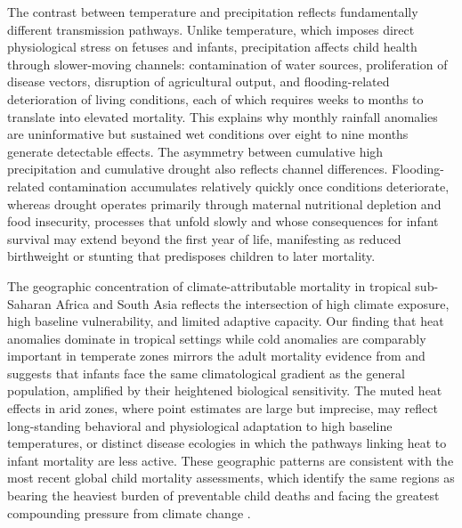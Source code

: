 \documentclass[a4paper]{article}
\begin{document}
The contrast between temperature and precipitation reflects fundamentally different transmission pathways. Unlike temperature, which imposes direct physiological stress on fetuses and infants, precipitation affects child health through slower-moving channels: contamination of water sources, proliferation of disease vectors, disruption of agricultural output, and flooding-related deterioration of living conditions, each of which requires weeks to months to translate into elevated mortality. This explains why monthly rainfall anomalies are uninformative but sustained wet conditions over eight to nine months generate detectable effects. The asymmetry between cumulative high precipitation and cumulative drought also reflects channel differences. Flooding-related contamination accumulates relatively quickly once conditions deteriorate, whereas drought operates primarily through maternal nutritional depletion and food insecurity, processes that unfold slowly and whose consequences for infant survival may extend beyond the first year of life, manifesting as reduced birthweight or stunting that predisposes children to later mortality.

The geographic concentration of climate-attributable mortality in tropical sub-Saharan Africa and South Asia reflects the intersection of high climate exposure, high baseline vulnerability, and limited adaptive capacity. Our finding that heat anomalies dominate in tropical settings while cold anomalies are comparably important in temperate zones mirrors the adult mortality evidence from \textcite{burke2025} and suggests that infants face the same climatological gradient as the general population, amplified by their heightened biological sensitivity. The muted heat effects in arid zones, where point estimates are large but imprecise, may reflect long-standing behavioral and physiological adaptation to high baseline temperatures, or distinct disease ecologies in which the pathways linking heat to infant mortality are less active. These geographic patterns are consistent with the most recent global child mortality assessments, which identify the same regions as bearing the heaviest burden of preventable child deaths and facing the greatest compounding pressure from climate change \parencite{UNIGME2025}.
\end{document}
